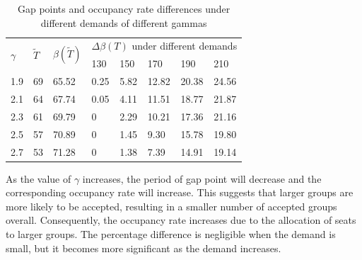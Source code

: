 \begin{table}[ht]
  \centering
  \caption{Gap points and occupancy rate differences under different demands of different gammas}
\begin{tabular}{llllllll}
  \hline
  \multicolumn{1}{|l|}{\multirow{2}{*}{$\gamma$}} & \multicolumn{1}{l|}{\multirow{2}{*}{$\tilde{T}$}} & \multicolumn{1}{l|}{\multirow{2}{*}{$\beta(\tilde{T})$}} & \multicolumn{5}{l|}{$\Delta \beta(T)$ under different demands}   \\ 
  \cline{4-8} 
  \multicolumn{1}{|l|}{}  & \multicolumn{1}{l|}{} & \multicolumn{1}{l|}{} & \multicolumn{1}{l|}{130} & \multicolumn{1}{l|}{150} & \multicolumn{1}{l|}{170} & \multicolumn{1}{l|}{190} & \multicolumn{1}{l|}{210} \\ 
  \hline
  \multicolumn{1}{|l|}{1.9}  & \multicolumn{1}{l|}{69} & \multicolumn{1}{l|}{65.52}  & \multicolumn{1}{l|}{0.25}  & \multicolumn{1}{l|}{5.82}  & \multicolumn{1}{l|}{12.82} & \multicolumn{1}{l|}{20.38} & \multicolumn{1}{l|}{24.56} \\
  \hline                                    
  \multicolumn{1}{|l|}{2.1}  & \multicolumn{1}{l|}{64} & \multicolumn{1}{l|}{67.74} & \multicolumn{1}{l|}{0.05}  & \multicolumn{1}{l|}{4.11}  & \multicolumn{1}{l|}{11.51} & \multicolumn{1}{l|}{18.77} & \multicolumn{1}{l|}{21.87} \\ 
  \hline           
  \multicolumn{1}{|l|}{2.3}  & \multicolumn{1}{l|}{61} & \multicolumn{1}{l|}{69.79}  & \multicolumn{1}{l|}{0}  & \multicolumn{1}{l|}{2.29}  & \multicolumn{1}{l|}{10.21} & \multicolumn{1}{l|}{17.36} & \multicolumn{1}{l|}{21.16} \\ 
  \hline           
  \multicolumn{1}{|l|}{2.5}  & \multicolumn{1}{l|}{57} & \multicolumn{1}{l|}{70.89} & \multicolumn{1}{l|}{0}  & \multicolumn{1}{l|}{1.45}  & \multicolumn{1}{l|}{9.30} & \multicolumn{1}{l|}{15.78} & \multicolumn{1}{l|}{19.80} \\ 
  \hline          
  \multicolumn{1}{|l|}{2.7}  & \multicolumn{1}{l|}{53} & \multicolumn{1}{l|}{71.28}  & \multicolumn{1}{l|}{0}  & \multicolumn{1}{l|}{1.38}  & \multicolumn{1}{l|}{7.39} & \multicolumn{1}{l|}{14.91} & \multicolumn{1}{l|}{19.14} \\ 
  \hline            
\end{tabular}
\end{table}


As the value of $\gamma$ increases, the period of gap point will decrease and the corresponding occupancy rate will increase. This suggests that larger groups are more likely to be accepted, resulting in a smaller number of accepted groups overall. Consequently, the occupancy rate increases due to the allocation of seats to larger groups. The percentage difference is negligible when the demand is small, but it becomes more significant as the demand increases.


